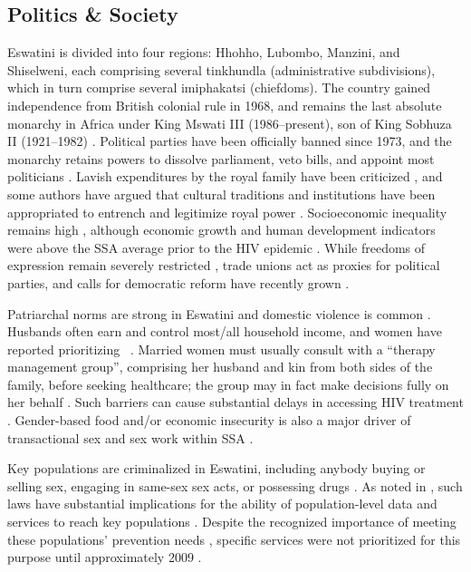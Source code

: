 \subsection{Politics \& Society}\label{intro.esw.soc}
Eswatini is divided into four regions: Hhohho, Lubombo, Manzini, and Shiselweni,
each comprising several tinkhundla (administrative subdivisions),
which in turn comprise several imiphakatsi (chiefdoms).
The country gained independence from British colonial rule in 1968,
and remains the last absolute monarchy in Africa
under King Mswati III (1986--present), son of King Sobhuza II (1921--1982) \cite{Mthembu2022}.
Political parties have been officially banned since 1973,
and the monarchy retains powers to
dissolve parliament, veto bills, and appoint most politicians \cite{Maphalala2021}.
Lavish expenditures by the royal family have been criticized \cite{Debly2014,Mthembu2022},
and some authors have argued that cultural traditions and institutions
have been appropriated to entrench and legitimize royal power \cite{Debly2014,Golomski2019}.
Socioeconomic inequality remains high \cite{Debly2014,Kali2023,DataBank},
although economic growth and human development indicators
were above the SSA average prior to the HIV epidemic \cite{Whiteside2007}.
While freedoms of expression remain severely restricted \cite{Debly2014,Mthembu2022},
trade unions act as proxies for political parties,
and calls for democratic reform have recently grown
\cite{Debly2014,Maphalala2021,Mthembu2022,Maseko2023}.
\par
Patriarchal norms are strong in Eswatini and domestic violence is common
\cite{Whiteside2003,Buseh2010,Simelane2011,Dlamini-Simelane2017,Golomski2019}.
Husbands often earn and control most/all household income, and women have reported prioritizing
~\cite{Dlamini-Simelane2017}.
Married women must usually consult with a ``therapy management group'',
comprising her husband and kin from both sides of the family, before seeking healthcare;
the group may in fact make decisions fully on her behalf \cite{Dlamini-Simelane2017}.
Such barriers can cause substantial delays in accessing HIV treatment \cite{Dlamini-Simelane2017}.
Gender-based food and/or economic insecurity is also a major driver of %
transactional sex and sex work within SSA \cite{Scorgie2012}.
\par
Key populations are criminalized in Eswatini, including anybody
buying or selling sex, engaging in same-sex sex acts, or possessing drugs \cite{UNAIDS2022lpa}. %
As noted in , such laws have substantial implications for
the ability of population-level data and services to reach key populations \cite{WHO2016kp}.
Despite the recognized importance of meeting these populations' prevention needs \cite{EswBSS2002},
specific services were not prioritized for this purpose until approximately 2009 \cite{NERCHA2009}.
